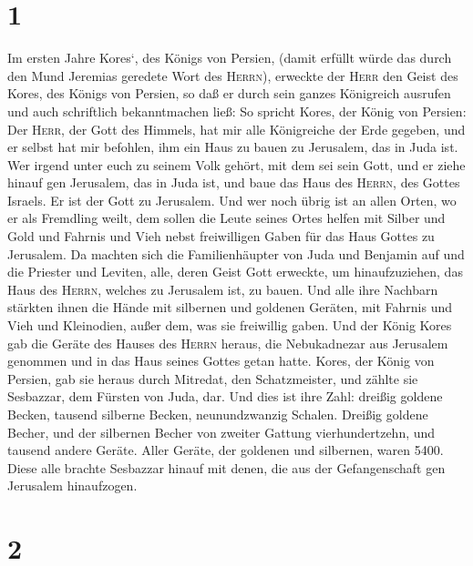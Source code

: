 \hypertarget{section}{%
\section{1}\label{section}}

 Im ersten Jahre Kores`, des Königs von Persien, (damit
erfüllt würde das durch den Mund Jeremias geredete Wort des
\textsc{Herrn}), erweckte der \textsc{Herr} den Geist des Kores, des
Königs von Persien, so daß er durch sein ganzes Königreich ausrufen und
auch schriftlich bekanntmachen ließ:  So spricht Kores,
der König von Persien: Der \textsc{Herr}, der Gott des Himmels, hat mir
alle Königreiche der Erde gegeben, und er selbst hat mir befohlen, ihm
ein Haus zu bauen zu Jerusalem, das in Juda ist.  Wer
irgend unter euch zu seinem Volk gehört, mit dem sei sein Gott, und er
ziehe hinauf gen Jerusalem, das in Juda ist, und baue das Haus des
\textsc{Herrn}, des Gottes Israels. Er ist der Gott zu Jerusalem.
 Und wer noch übrig ist an allen Orten, wo er als
Fremdling weilt, dem sollen die Leute seines Ortes helfen mit Silber und
Gold und Fahrnis und Vieh nebst freiwilligen Gaben für das Haus Gottes
zu Jerusalem.  Da machten sich die Familienhäupter von
Juda und Benjamin auf und die Priester und Leviten, alle, deren Geist
Gott erweckte, um hinaufzuziehen, das Haus des \textsc{Herrn}, welches
zu Jerusalem ist, zu bauen.  Und alle ihre Nachbarn
stärkten ihnen die Hände mit silbernen und goldenen Geräten, mit Fahrnis
und Vieh und Kleinodien, außer dem, was sie freiwillig gaben.
 Und der König Kores gab die Geräte des Hauses des
\textsc{Herrn} heraus, die Nebukadnezar aus Jerusalem genommen und in
das Haus seines Gottes getan hatte.  Kores, der König von
Persien, gab sie heraus durch Mitredat, den Schatzmeister, und zählte
sie Sesbazzar, dem Fürsten von Juda, dar.  Und dies ist
ihre Zahl: dreißig goldene Becken, tausend silberne Becken,
neunundzwanzig Schalen.  Dreißig goldene Becher, und der
silbernen Becher von zweiter Gattung vierhundertzehn, und tausend andere
Geräte.  Aller Geräte, der goldenen und silbernen, waren
5400. Diese alle brachte Sesbazzar hinauf mit denen, die aus der
Gefangenschaft gen Jerusalem hinaufzogen.

\hypertarget{section-1}{%
\section{2}\label{section-1}}

